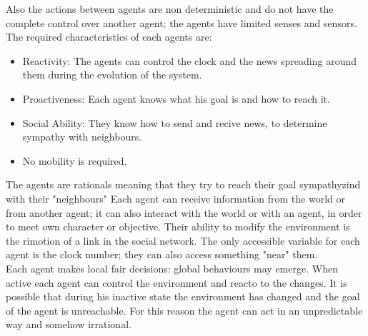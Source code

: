 \documentclass[11pt]{article} %
\begin{document}
Also the actions between agents are non deterministic and do not have the complete control over another
agent; the agents have limited senses and sensors.
\\

The required characteristics of each agents are: \begin{itemize}
\item Reactivity: The agents can control the clock and the news spreading around them during the evolution of the system.
\item Proactiveness: Each agent knows what his goal is and how to reach it.
\item Social Ability: They know how to send and recive news, to determine sympathy with neighbours.
\item No mobility is required. 

\end{itemize}

The agents are rationals meaning that they try to reach their goal sympathyzind with their "neighbours"
Each agent can receive information from the world or from another agent; it can also interact with 
the world or with an agent, in order to meet own character or objective.
Their ability to modify the environment is the rimotion of a link in the social network.
The only accessible variable for each agent is the clock number; they can also access something "near"
them.
\\

Each agent makes local fair decisions: global behaviours may emerge.
When active each agent can control the environment and reacto to the changes. It is possible
that during his inactive state the environment has changed and the goal of the agent is unreachable.
For this reason the agent can act in an unpredictable way and somehow irrational.
\end{document}
